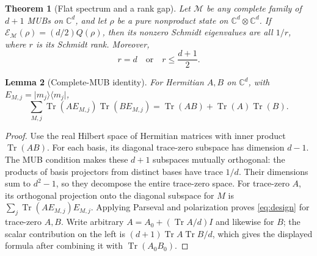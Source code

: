\documentclass[11pt]{article}
\newtheorem{theorem}{Theorem}[section]
\newtheorem{lemma}[theorem]{Lemma}
\theoremstyle{remark}\newtheorem{remark}[theorem]{Remark}
\newcommand{\C}{\mathbb C}
\newcommand{\M}{\mathcal M}
\newcommand{\E}{\mathcal E}
\newcommand{\ket}[1]{\lvert#1\rangle}
\newcommand{\bra}[1]{\langle#1\rvert}
\DeclareMathOperator{\Tr}{Tr}
\begin{document}
\begin{theorem}[Flat spectrum and a rank gap]\label{thm:rank}
Let $\M$ be any complete family of $d+1$ MUBs on $\C^d$, and let $\rho$ be a pure nonproduct state on $\C^d\otimes\C^d$. If $\E_\M(\rho)=(d/2)Q(\rho)$, then its nonzero Schmidt eigenvalues are all $1/r$, where $r$ is its Schmidt rank. Moreover,
\begin{equation}\label{eq:rankgap}
 r=d\quad\text{or}\quad r\le\frac{d+1}{2}.
\end{equation}
\end{theorem}

\begin{lemma}[Complete-MUB identity]\label{lem:design}
For Hermitian $A,B$ on $\C^d$, with $E_{M,j}=\ket{m_j}\bra{m_j}$,
\begin{equation}\label{eq:design}
 \sum_{M,j}\Tr(AE_{M,j})\Tr(BE_{M,j})=\Tr(AB)+\Tr(A)\Tr(B).
\end{equation}
\end{lemma}
\begin{proof}
Use the real Hilbert space of Hermitian matrices with inner product $\Tr(AB)$. For each basis, its diagonal trace-zero subspace has dimension $d-1$. The MUB condition makes these $d+1$ subspaces mutually orthogonal: the products of basis projectors from distinct bases have trace $1/d$. Their dimensions sum to $d^2-1$, so they decompose the entire trace-zero space. For trace-zero $A$, its orthogonal projection onto the diagonal subspace for $M$ is $\sum_j\Tr(AE_{M,j})E_{M,j}$. Applying Parseval and polarization proves \eqref{eq:design} for trace-zero $A,B$. Write arbitrary $A=A_0+(\Tr A/d)I$ and likewise for $B$; the scalar contribution on the left is $(d+1)\Tr A\Tr B/d$, which gives the displayed formula after combining it with $\Tr(A_0B_0)$.
\end{proof}
\end{document}
